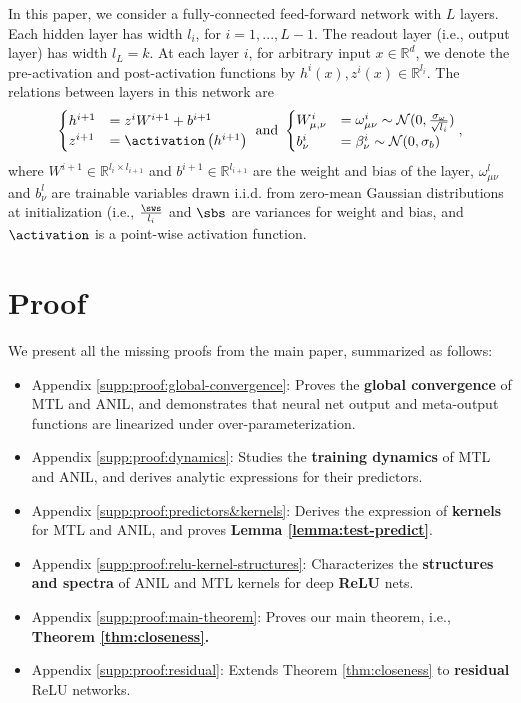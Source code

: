 \documentclass{article}
\begin{document}
In this paper, we consider a fully-connected feed-forward network with $L$
layers. Each hidden layer has width $l_{i}$, for $i = 1, ..., L - 1$. The readout layer (i.e., output layer) has width $l_{L} = k$. At each layer $i$, for arbitrary input $x\in \mathbb R^{d}$, we denote the pre-activation and post-activation functions by $h^i(x), z^i(x)\in\mathbb R^{l_i}$. The relations between layers in this network are
\begin{align}
\label{eq:recurrence}
\begin{cases}
    h^{i+1}&=z^i W^{i+1} + b^{i+1}
    \\
    z^{i+1}&=\activation \left(h^{i+1}\right) 
    \end{cases}
    \,\, \textrm{and} 
    \,\,
    \begin{cases}
  W^i_{\mu,\nu}& =  \omega_{\mu \nu}^i \sim \mathcal{N} (0, \frac {\sigma_\omega} {\sqrt{l_i}} )
    \\
    b_\nu^i &= \beta_\nu^i \sim \mathcal{N} (0,\sigma_b  )
\end{cases}
,
\end{align}
where $W^{i+1}\in \mathbb R^{l_i\times l_{i+1}}$ and $b^{i+1}\in\mathbb R^{l_{i+1}}$ are the weight and bias of the layer, $\omega_{\mu \nu}^l$ and $ b_\nu^l $ are trainable variables drawn i.i.d. from zero-mean Gaussian distributions at initialization (i.e.,
$\frac{\sws}{l_i}$ and $\sbs$ are variances for weight and bias, and $\activation$ is a point-wise activation function.
\section{Proof}\label{supp:proof}
We present all the missing proofs from the main paper, summarized as follows:
\begin{itemize}
    \item Appendix \ref{supp:proof:global-convergence}: Proves the \textbf{global convergence} of MTL and ANIL, and demonstrates that neural net output and meta-output functions are linearized under over-parameterization.
    \item Appendix \ref{supp:proof:dynamics}: Studies the \textbf{training dynamics} of MTL and ANIL, and derives analytic expressions for their predictors.
    \item Appendix \ref{supp:proof:predictors&kernels}: Derives the expression of \textbf{kernels} for MTL and ANIL, and proves \textbf{Lemma \ref{lemma:test-predict}}.
    \item Appendix \ref{supp:proof:relu-kernel-structures}: Characterizes the \textbf{structures and spectra} of ANIL and MTL kernels for deep \textbf{ReLU} nets.
    \item Appendix \ref{supp:proof:main-theorem}: Proves our main theorem, i.e., \textbf{Theorem \ref{thm:closeness}.}
    \item Appendix \ref{supp:proof:residual}: Extends Theorem \ref{thm:closeness} to \textbf{residual} ReLU networks.
\end{itemize}
\end{document}
